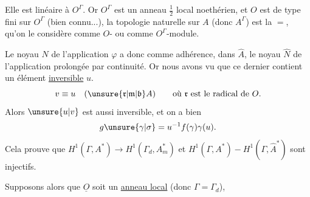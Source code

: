 Elle est linéaire  à $O^\Gamma$. Or $O^\Gamma$ est un anneau $\frac12$ local noethérien, et $O$ est  de type fini sur $O^\Gamma$ (bien connu...),  la topologie naturelle sur $A$ (donc $A^\Gamma$) est la $=$, qu'on le considère comme $O$- ou comme $O^\Gamma$-module.

Le noyau $N$ de l'application $\varphi$ a donc comme adhérence, dans $\widehat{A}$, le noyau $\widehat{N}$ de l'application prolongée par continuité. Or nous avons vu que ce dernier contient un élément \uline{inversible} $u$.  
\[
v\equiv u\quad(\unsure{\mathfrak r|\mathfrak m|\mathfrak b}A)\qquad\text{où }\mathfrak r\text{ est le radical de }O.
\]
Alors $\unsure{u|v}$ est aussi inversible, et on a bien
\[
g\unsure{\gamma|\sigma}=u^{-1}f(\gamma)\gamma(u).
\]
\margin{$\Vert$}
Cela prouve que $H^1(\Gamma,A^*)\longrightarrow H^1(\Gamma_d,A_m^*)$ et $H^1(\Gamma,A^*)-H^1(\Gamma,\widehat{A}^*)$ sont injectifs.

Supposons alors que $\underline{O}$ soit un \uline{anneau local} (donc $\Gamma=\Gamma_d$),  
